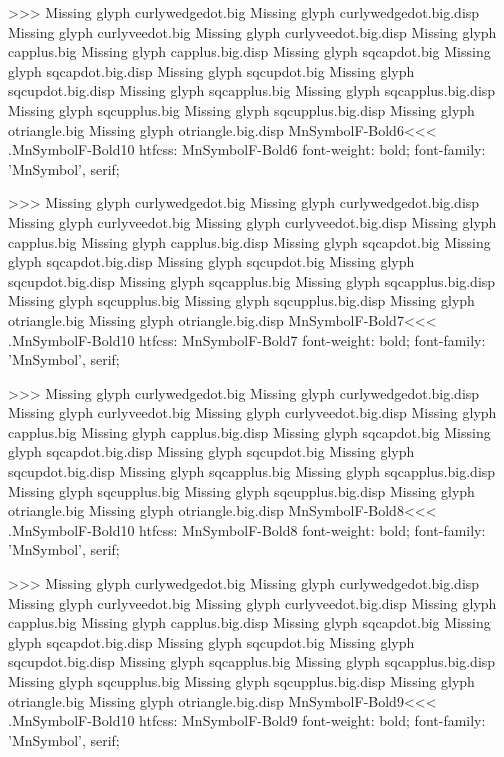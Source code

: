 >>>
Missing glyph	curlywedgedot.big
Missing glyph	curlywedgedot.big.disp
Missing glyph	curlyveedot.big
Missing glyph	curlyveedot.big.disp
Missing glyph	capplus.big
Missing glyph	capplus.big.disp
Missing glyph	sqcapdot.big
Missing glyph	sqcapdot.big.disp
Missing glyph	sqcupdot.big
Missing glyph	sqcupdot.big.disp
Missing glyph	sqcapplus.big
Missing glyph	sqcapplus.big.disp
Missing glyph	sqcupplus.big
Missing glyph	sqcupplus.big.disp
Missing glyph	otriangle.big
Missing glyph	otriangle.big.disp
\<MnSymbolF-Bold6\><<<
.MnSymbolF-Bold10
htfcss:  MnSymbolF-Bold6  font-weight: bold; font-family: 'MnSymbol', serif;

>>>
Missing glyph	curlywedgedot.big
Missing glyph	curlywedgedot.big.disp
Missing glyph	curlyveedot.big
Missing glyph	curlyveedot.big.disp
Missing glyph	capplus.big
Missing glyph	capplus.big.disp
Missing glyph	sqcapdot.big
Missing glyph	sqcapdot.big.disp
Missing glyph	sqcupdot.big
Missing glyph	sqcupdot.big.disp
Missing glyph	sqcapplus.big
Missing glyph	sqcapplus.big.disp
Missing glyph	sqcupplus.big
Missing glyph	sqcupplus.big.disp
Missing glyph	otriangle.big
Missing glyph	otriangle.big.disp
\<MnSymbolF-Bold7\><<<
.MnSymbolF-Bold10
htfcss:  MnSymbolF-Bold7  font-weight: bold; font-family: 'MnSymbol', serif;

>>>
Missing glyph	curlywedgedot.big
Missing glyph	curlywedgedot.big.disp
Missing glyph	curlyveedot.big
Missing glyph	curlyveedot.big.disp
Missing glyph	capplus.big
Missing glyph	capplus.big.disp
Missing glyph	sqcapdot.big
Missing glyph	sqcapdot.big.disp
Missing glyph	sqcupdot.big
Missing glyph	sqcupdot.big.disp
Missing glyph	sqcapplus.big
Missing glyph	sqcapplus.big.disp
Missing glyph	sqcupplus.big
Missing glyph	sqcupplus.big.disp
Missing glyph	otriangle.big
Missing glyph	otriangle.big.disp
\<MnSymbolF-Bold8\><<<
.MnSymbolF-Bold10
htfcss:  MnSymbolF-Bold8  font-weight: bold; font-family: 'MnSymbol', serif;

>>>
Missing glyph	curlywedgedot.big
Missing glyph	curlywedgedot.big.disp
Missing glyph	curlyveedot.big
Missing glyph	curlyveedot.big.disp
Missing glyph	capplus.big
Missing glyph	capplus.big.disp
Missing glyph	sqcapdot.big
Missing glyph	sqcapdot.big.disp
Missing glyph	sqcupdot.big
Missing glyph	sqcupdot.big.disp
Missing glyph	sqcapplus.big
Missing glyph	sqcapplus.big.disp
Missing glyph	sqcupplus.big
Missing glyph	sqcupplus.big.disp
Missing glyph	otriangle.big
Missing glyph	otriangle.big.disp
\<MnSymbolF-Bold9\><<<
.MnSymbolF-Bold10
htfcss:  MnSymbolF-Bold9  font-weight: bold; font-family: 'MnSymbol', serif;

